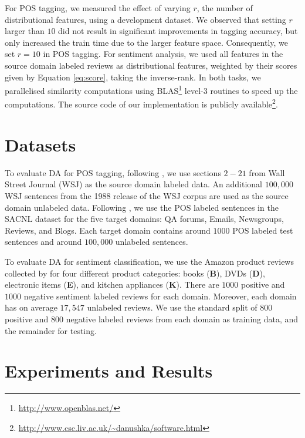 \documentclass[11pt]{article}
\begin{document}
For POS tagging, we measured the effect of varying $r$, the number of distributional features,
using a development dataset. We observed that setting $r$ larger than $10$ did not result in significant 
improvements in tagging accuracy, but only increased the train time due to the larger feature space. 
Consequently, we set $r = 10$ in POS tagging.
For sentiment analysis, we used all features in the source domain
labeled reviews as distributional features, weighted by their scores given by Equation \ref{eq:score},
taking the inverse-rank.
In both tasks, we parallelised similarity computations using BLAS\footnote{\url{http://www.openblas.net/}}
level-3 routines to speed up the computations. 
The source code of our implementation is publicly available\footnote{\url{http://www.csc.liv.ac.uk/~danushka/software.html}}.

\section{Datasets}
\label{sec:data}

To evaluate DA for POS tagging,
following , we use sections $2-21$ from Wall Street Journal (WSJ) as the source domain
labeled data. An additional $100,000$ WSJ sentences from the 1988 release of the WSJ corpus are used as
the source domain unlabeled data.
Following , we use the POS labeled sentences in the SACNL
dataset \cite{SANCL:2012} for the five target domains: QA forums, Emails, Newsgroups,  Reviews, and Blogs.
Each target domain contains around $1000$ POS labeled test sentences and around $100,000$ unlabeled sentences.

To evaluate DA for sentiment classification,
we use the Amazon product reviews collected by  for four different product categories:
books (\textbf{B}), DVDs (\textbf{D}), electronic items (\textbf{E}), and kitchen appliances (\textbf{K}).
There are $1000$ positive and $1000$ negative sentiment labeled reviews for each domain.
Moreover, each domain has on average $17,547$ unlabeled reviews.
We use the standard split of $800$ positive and $800$ negative labeled reviews from each domain
as training data, and the remainder for testing.

 
 

\section{Experiments and Results}
\label{sec:exp}
\end{document}
